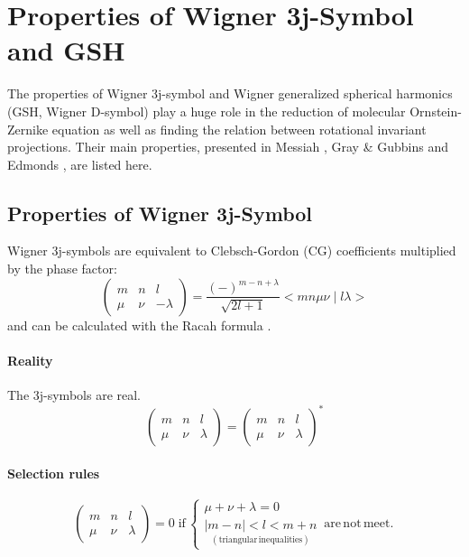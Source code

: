 
\chapter{Properties of Wigner 3j-Symbol and GSH \label{chpt:symmetry}}

The properties of Wigner 3j-symbol and Wigner generalized spherical
harmonics (\acs{GSH}, Wigner D-symbol) play a huge role in the reduction
of molecular Ornstein-Zernike equation as well as finding the relation
between rotational invariant projections. Their main properties, presented
in Messiah \citep{Messiah}, Gray \& Gubbins \citep{Gray-Gubbins}
and Edmonds \citep{Edmonds}, are listed here.

\section{Properties of Wigner 3j-Symbol}

Wigner 3j-symbols are equivalent to Clebsch-Gordon (CG) coefficients
multiplied by the phase factor:
\begin{equation}
\left(\begin{array}{ccc}
m & n & l\\
\mu & \nu & -\lambda
\end{array}\right)=\frac{\left(-\right)^{m-n+\lambda}}{\sqrt{2l+1}}<mn\mu\nu\mid l\lambda>
\end{equation}
and can be calculated with the Racah formula \citep{Messiah}.

\subsubsection*{Reality}

The 3j-symbols are real.
\begin{equation}
\left(\begin{array}{ccc}
m & n & l\\
\mu & \nu & \lambda
\end{array}\right)=\left(\begin{array}{ccc}
m & n & l\\
\mu & \nu & \lambda
\end{array}\right)^{*}
\end{equation}


\subsubsection*{Selection rules}

\begin{equation}
\left(\begin{array}{ccc}
m & n & l\\
\mu & \nu & \lambda
\end{array}\right)=0\;\mathrm{if}\,\left\{ \begin{array}{l}
\mu+\nu+\lambda=0\\
\underset{\mathrm{(triangular\,inequalities)}}{\left|m-n\right|<l<m+n}
\end{array}\right.\,\mathrm{are\,not\,meet.}\,
\end{equation}


